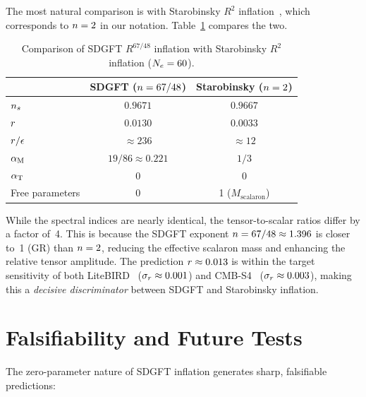 \documentclass[a4paper,11pt]{article}
\begin{document}
The most natural comparison is with Starobinsky $R^2$
inflation~\cite{Starobinsky1980}, which corresponds to
$n = 2$ in our notation.  Table~\ref{tab:starobinsky}
compares the two.

\begin{table}[h]
\centering
\caption{Comparison of SDGFT $R^{67/48}$ inflation with
Starobinsky $R^2$ inflation ($N_e = 60$).}
\label{tab:starobinsky}
\begin{tabular}{@{}lcc@{}}
\toprule
 & SDGFT ($n = 67/48$) & Starobinsky ($n = 2$) \\
\midrule
$n_s$             & $0.9671$ & $0.9667$ \\
$r$            & $0.0130$ & $0.0033$ \\
$r/\epsilon$     & $\approx 236$ & $\approx 12$ \\
$\alpha_{\mathrm{M}}$             & $19/86 \approx 0.221$ & $1/3$ \\
$\alpha_{\mathrm{T}}$             & $0$ & $0$ \\
Free parameters   & 0 & 1 ($M_{\mathrm{scalaron}}$) \\
\bottomrule
\end{tabular}
\end{table}

While the spectral indices are nearly identical, the tensor-to-scalar
ratios differ by a factor of~4.  This is because the SDGFT exponent
$n = 67/48 \approx 1.396$ is closer to~1 (GR) than $n = 2$,
reducing the effective scalaron mass and enhancing the relative
tensor amplitude.  The prediction $r \approx 0.013$ is within
the target sensitivity of both
LiteBIRD~\cite{LiteBIRD2023} ($\sigma_r \approx 0.001$) and
CMB-S4~\cite{CMBS4_2022} ($\sigma_r \approx 0.003$), making this
a \emph{decisive discriminator} between SDGFT and Starobinsky
inflation.

\section{Falsifiability and Future Tests}
\label{sec:falsification}

The zero-parameter nature of SDGFT inflation generates sharp,
falsifiable predictions:
\end{document}
